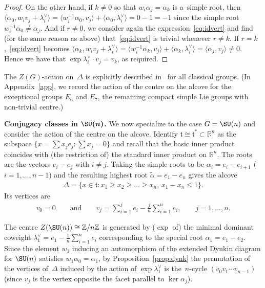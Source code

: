 \begin{proof}
On the other hand, if $k\neq 0$ so that $w_i \alpha_j = \alpha_k$ is a~simple root, then $\langle \alpha_0,w_i
v_j+\lambda_i^\vee\rangle = \langle w_i^{-1} \alpha_0, v_j \rangle + \langle \alpha_0,\lambda_i^\vee\rangle = 0-1=-1$
since the simple root $w_i^{-1}\alpha_0\neq \alpha_j$.
And if $r\neq 0$, we consider again the expression~\eqref{eq:idvert} and f\/ind (for the same reason as above)
that~\eqref{eq:idvert} is trivial whenever $r\neq k$.
If $r=k$,~\eqref{eq:idvert} becomes $\langle \alpha_k,w_i v_j+ \lambda_i^\vee \rangle = \langle w_i^{-1} \alpha_k,v_j
\rangle + \langle \alpha_k,\lambda_i^\vee \rangle = \langle \alpha_j,v_j \rangle \neq 0$.
Hence we have that $\exp \lambda_i^\vee \cdot v_j = v_k$, as required.
\end{proof}

The $Z(G)$-action on~$\Delta$ is explicitly described in~\cite{TL} for all classical groups.
(In Appendix~\ref{app}, we record the action of the centre on the alcove for the exceptional groups $E_6$ and $E_7$, the
remaining compact simple Lie groups with non-trivial centre.)

{\bf Conjugacy classes in $\boldsymbol{\SU(n)}$.}
We now specialize to the case $G=\SU(n)$ and consider the action of the centre on the alcove.
Identify $\mathfrak{t}\cong \mathfrak{t}^* \subset {\mathbb{R}}^n$ as the subspace $\{x= \sum x_j e_j \colon \sum x_j =0
\}$ and recall that the basic inner product coincides with (the restriction of) the standard inner product on
${\mathbb{R}}^n$.
The roots are the vectors $e_i-e_j$ with $i\neq j$.
Taking the simple roots to be $\alpha_i=e_i-e_{i+1}$ ($i=1,\ldots,n-1$) and the resulting highest root
$\tilde{\alpha}=e_1-e_n$ gives the alcove
\begin{gather*}
\Delta = \{x \in \mathfrak{t} \colon x_1 \geq x_2 \geq \dots \geq x_n, \, x_1-x_n\leq 1 \}.
\end{gather*}
Its vertices are
\begin{gather*}
v_0=0
\qquad
\text{and}
\qquad
v_j=\sum\limits_{i=1}^{j}e_i-\frac{j}{n}\sum\limits_{i=1}^n e_i,
\qquad
j=1, \ldots, n.
\end{gather*}

The centre $Z(\SU(n))\cong {\mathbb{Z}}/n{\mathbb{Z}}$ is generated by ($\exp$ of) the minimal dominant coweight
$\lambda_1^\vee = e_1 -\frac{1}{n}\sum\limits_{i=1}^n e_i$ corresponding to the special root $\alpha_1=e_1-e_2$.
Since the element $w_1$ inducing an automorphism of the extended Dynkin diagram for $\SU(n)$ satisf\/ies
$w_1\alpha_0=\alpha_1$, by Proposition~\ref{prop:dynk} the permutation of the vertices of~$\Delta$ induced by the action
of $\exp \lambda_1^\vee$ is the~$n$-cycle $(v_0   v_1  \cdots   v_{n-1})$ (since $v_j$ is the vertex opposite the
facet parallel to $\ker \alpha_j$).

